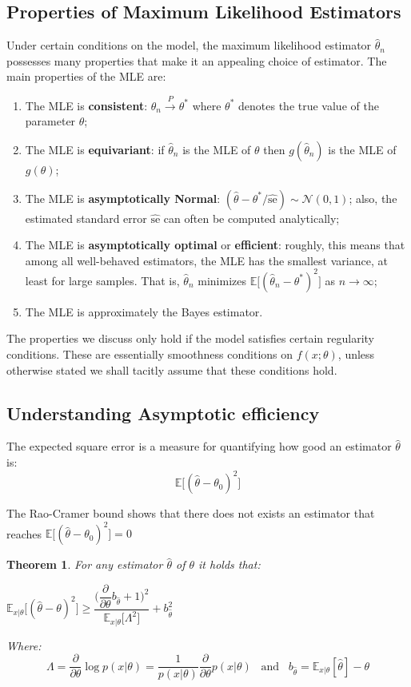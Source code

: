 \documentclass[twoside]{article}
\newcounter{lecnum}
\newtheorem{theorem}{Theorem}[lecnum]
\begin{document}
\subsection{Properties of Maximum Likelihood Estimators}
Under certain conditions on the model, the maximum likelihood estimator $\hat{\theta}_n$ possesses many properties that make it an appealing choice of estimator. The main properties of the MLE are:
\begin{enumerate}
    \item The MLE is \textbf{consistent}: $\hat{\theta}_n \overset{P}{\to} \theta^*$ where $\theta^*$ denotes the true value of the parameter $\theta$;
    \item The MLE is \textbf{equivariant}: if $\hat{\theta}_n$ is the MLE of $\theta$ then $g(\hat{\theta}_n)$ is the MLE of $g(\theta)$;
    \item  The MLE is \textbf{asymptotically Normal}: $(\hat{\theta} - \theta^* / \hat{\text{se}}) \sim \mathcal{N}(0, 1)$; also, the
estimated standard error $\hat{\text{se}}$ can often be computed analytically;
    \item The MLE is \textbf{asymptotically optimal} or \textbf{efficient}: roughly, this means that among all well-behaved estimators, the MLE has the smallest variance, at least for large samples. That is, $\hat{\theta}_n$ minimizes $\mathbb{E}\big[ (\hat{\theta}_n -\theta^*)^2\big]$ as  $n \to \infty$;
    \item The MLE is approximately the Bayes estimator.  
\end{enumerate}
The properties we discuss only hold if the model satisfies certain regularity conditions. These are essentially smoothness conditions on $f(x; \theta)$, unless otherwise stated we shall tacitly assume that these conditions hold.

\subsection{Understanding Asymptotic efficiency}
The expected square error is a measure for quantifying how good an estimator $\hat{\theta}$ is:
$$\mathbb{E}\big[ (\hat{\theta}- \theta_0)^2\big]$$

The Rao-Cramer bound shows that there does not exists an estimator that reaches $\mathbb{E}\big[ (\hat{\theta}- \theta_0)^2\big] = 0$

\begin{theorem}For any  estimator $\hat{\theta}$ of $\theta$ it holds that:\medskip

$\mathbb{E}_{x|\theta}\big[ (\hat{\theta} - \theta)^2\big] \geq \dfrac{\big(\dfrac{\partial}{\partial \theta} b_{\hat{\theta}} + 1 \big)^2}{\mathbb{E}_{x|\theta}\big[ \Lambda^2\big]} + b_{\hat{\theta}}^2$\medskip

Where:
$$\Lambda = \dfrac{\partial}{\partial{\theta}} \log{p(x|\theta)}= \dfrac{1}{p(x|\theta)} \dfrac{\partial}{\partial{\theta}} p(x|\theta) \hspace{10pt} \text{and} \hspace{10pt} b_{\hat{\theta}} = \mathbb{E}_{x|\theta}[\hat{\theta}]-\theta$$
\end{theorem}
\end{document}
